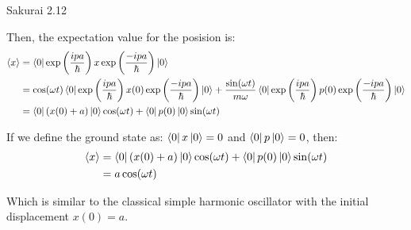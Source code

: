 \documentclass{article}
\newcommand{\expc}[1]{\left<#1\right>}
\begin{document}
\begin{section}{Sakurai 2.12}
\begin{tcolorbox}
	Then, the expectation value for the posision is:
	\begin{align*}
		\expc{x}
		 & = \bra{0} \exp \left( \frac{ipa}{\hbar} \right) x \exp \left( \frac{-ipa}{\hbar} \right) \ket{0}                               \\
		 & = \cos (\omega t)\bra{0} \exp \left( \frac{ipa}{\hbar} \right) x(0) \exp \left( \frac{-ipa}{\hbar} \right) \ket{0}  +
		\frac{\sin(\omega t)}{m \omega} \bra{0} \exp \left( \frac{ipa}{\hbar} \right) p(0) \exp \left( \frac{-ipa}{\hbar} \right) \ket{0} \\
		 & = \bra{0} (x(0)+a) \ket{0} \cos (\omega t) + \bra{0} p(0) \ket{0} \sin (\omega t)                                              \\
	\end{align*}

	If we define the ground state as: $\bra{0}x\ket{0} = 0$ and $\bra{0}p\ket{0} = 0$, then:
	\begin{align*}
		\expc{x}
		 & = \bra{0} (x(0)+a) \ket{0} \cos (\omega t) + \bra{0} p(0) \ket{0} \sin (\omega t) \\
		 & = a \cos (\omega t)
	\end{align*}

	Which is similar to the classical simple harmonic oscillator with the initial displacement $x(0) = a$.
\end{tcolorbox}
\end{section}
\end{document}

